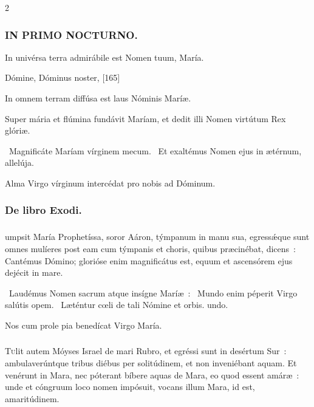 \documentclass[9pt,twoside]{extarticle}
\begin{document}
\begin{multicols}{2}
\subsubsection*{\center \textsc{IN PRIMO NOCTURNO.}}
\begin{tightlist}{}
\item {} In univérsa terra admirábile est Nomen tuum, María.
\item {} Dómine, Dóminus noster,  [165]
\item {} In omnem terram diffúsa est laus Nóminis Maríæ.
\item {} Super mária et flúmina fundávit Maríam, et dedit illi Nomen virtútum Rex glóriæ.
\item {}~Magnificáte Maríam vírginem mecum. ~Et exaltémus Nomen ejus in ætérnum, allelúja.
\item {\small {} Alma Virgo vírginum intercédat pro nobis ad Dóminum.}
\end{tightlist}

\subsubsection*{\center De libro Exodi.}
\subsubsection*{\center {}}
umpsit María Prophetíssa, soror Aáron, týmpanum in manu sua, egressǽque sunt omnes mulíeres post eam cum týmpanis et choris, quibus præcinébat, dicens~: Cantémus Dómino; glorióse enim magnificátus est, equum et ascensórem ejus dejécit in mare.

\begin{tightlist}{}
\item {}~Laudémus Nomen sacrum atque insígne Maríæ~: \textred{*}~Mundo enim péperit Virgo salútis opem. ~Læténtur cœli de tali Nómine et orbis. undo.
\item {\small {} Nos cum prole pia benedícat Virgo María.}
\end{tightlist}

\subsubsection*{\center {}}
\lettrine{T}ulit autem Móyses Israel de mari Rubro, et egréssi sunt in desértum Sur~: ambulaverúntque tribus diébus per solitúdinem, et non inveniébant aquam. Et venérunt in Mara, nec póterant bíbere aquas de Mara, eo quod essent amáræ~: unde et cóngruum loco nomen impósuit, vocans illum Mara, id est, amaritúdinem.


\end{multicols}
\end{document}
